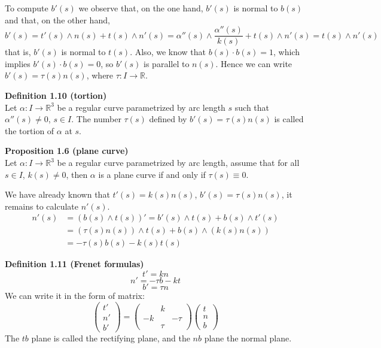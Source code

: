 \documentclass{article}
\begin{document}
\par
To compute $b'(s)$ we observe that, on the one hand, $b'(s)$ is normal to $b(s)$ and that, on the other hand,
$$
    b'(s) = t'(s) \wedge n(s) + t(s) \wedge n'(s) = \alpha''(s) \wedge \frac{\alpha''(s)}{k(s)} + t(s) \wedge n'(s) = t(s) \wedge n'(s)
$$
that is, $b'(s)$ is normal to $t(s)$. Also, we know that $b(s) \cdot b(s) = 1$, which implies $b'(s) \cdot b(s) = 0$, so $b'(s)$ is parallel to $n(s)$.
Hence we can write $b'(s) = \tau(s)n(s)$, where $\tau: I \to \mathbb{R}$.

\par
\textbf{Definition 1.10 (tortion)}\\
Let $\alpha: I \to \mathbb R^3$ be a regular curve parametrized by arc length $s$ such that $\alpha''(s) \neq 0$, $s \in I$.
The number $\tau(s)$ defined by $b'(s) = \tau(s)n(s)$ is called the tortion of $\alpha$ at $s$.

\par
\textbf{Proposition 1.6 (plane curve)}\\
Let $\alpha: I \to \mathbb R^3$ be a regular curve parametrized by arc length, assume that for all $s \in I$, $k(s) \neq 0$, then
$\alpha$ is a plane curve if and only if $\tau(s) \equiv 0$.

\par
We have already known that $t'(s) = k(s)n(s)$, $b'(s) = \tau(s)n(s)$, it remains to calculate $n'(s)$.
$$
\begin{aligned}
    n'(s) &= (b(s) \wedge t(s))' = b'(s) \wedge t(s) + b(s) \wedge t'(s)\\
    &= (\tau(s)n(s)) \wedge t(s) + b(s) \wedge (k(s)n(s))\\
    &= -\tau(s)b(s) - k(s)t(s)
\end{aligned}
$$

\par
\textbf{Definition 1.11 (Frenet formulas)}\\
$$
    t' = kn
$$
$$
    n' = -\tau b - kt
$$
$$
    b' = \tau n
$$
We can write it in the form of matrix:
$$
    \left(\begin{array}{c}
        t'\\n'\\b'
    \end{array}
    \right)
    =
    \left(\begin{array}{ccc} 
     & k & \\ 
    -k & & -\tau \\
     & \tau &
    \end{array}\right)
    \left(\begin{array}{c}
        t\\n\\b
    \end{array}
    \right)
$$
The $tb$ plane is called the rectifying plane, and the $nb$ plane the normal plane.
\end{document}
